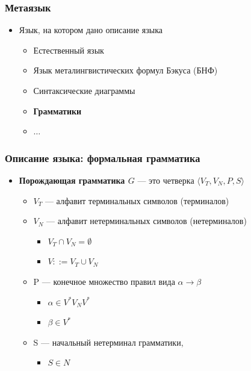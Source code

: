 \documentclass{beamer}
\begin{document}
\begin{frame}[fragile]
  \transwipe[direction=90]
  \frametitle{Метаязык}
  \begin{itemize}
    \item Язык, на котором дано описание языка
    \begin{itemize}
      \item Естественный язык
      \item Язык металингвистических формул Бэкуса (БНФ)
      \item Синтаксические диаграммы
      \item \textbf{Грамматики}
      \item $\dots$
    \end{itemize}
  \end{itemize}
\end{frame}

\begin{frame}[fragile]
  \transwipe[direction=90]
  \frametitle{Описание языка: формальная грамматика}
  \begin{itemize}
    \item \textbf{Порождающая грамматика $G$} --- это четверка $\langle V_T, V_N, P, S \rangle$

    \begin{itemize}
      \item $V_T$ --- алфавит терминальных  символов (терминалов)
      \item $V_N$ --- алфавит нетерминальных  символов (нетерминалов)
      \begin{itemize}
        \item $V_T \cap V_N = \emptyset$
        \item $V ::= V_T \cup V_N$
      \end{itemize}
      \item P --- конечное множество правил вида $\alpha \rightarrow \beta$
      \begin{itemize}
        \item $\alpha \in V^* V_N V^*$
        \item $\beta \in V^*$
      \end{itemize}
      \item S --- начальный нетерминал грамматики,\begin{itemize}
        \item $S  \in N$
      \end{itemize}
    \end{itemize}
  \end{itemize}
\end{frame}
\end{document}

